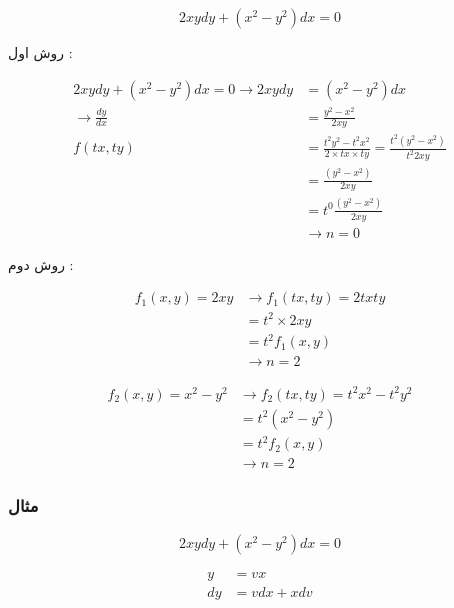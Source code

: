 \documentclass[12pt]{book}
\begin{document}
$$
2xydy + (x^{2} - y^{2})dx = 0
$$

روش اول :

\begin{align*}
2xydy + ( x^{2} - y^{2} ) dx = 0 \to 2xydy &= ( x^{2} - y^{2} ) dx  \\
\to \frac{dy}{dx} &= \frac{y^{2} - x^{2}}{2xy} \\
f(tx,ty) &= \frac{t^{2}y^{2} - t^{2}x^{2}}{2 \times tx \times ty} = \frac{t^{2} ( y^{2} - x^{2} )}{ t^{2} 2xy} \\
&=  \frac{( y^{2} - x^{2} )}{2xy} \\ 
&= t^{0}  \frac{( y^{2} - x^{2} )}{2xy} \\
&\to n = 0
\end{align*}


روش دوم :

\begin{align*}
f_{1}(x,y) = 2xy &\to f_{1}(tx,ty) = 2 tx ty \\
&= t^{2} \times 2xy \\
&=  t^{2} f_{1}(x,y) \\
&\to n = 2
\end{align*}

\begin{align*}
f_{2}(x,y) = x^{2} - y^{2} &\to f_{2}(tx,ty) = t^{2}x^{2} - t^{2}y^{2} \\
&= t^{2} ( x^{2} - y^{2} ) \\
&= t^{2} f_{2}(x,y) \\
&\to n = 2
\end{align*}




\subsubsection{مثال}


$$
2xydy + (x^{2} - y^{2})dx = 0
$$

\begin{align*}
y &= vx \\
dy &= vdx + xdv \\
\end{align*}
\end{document}
